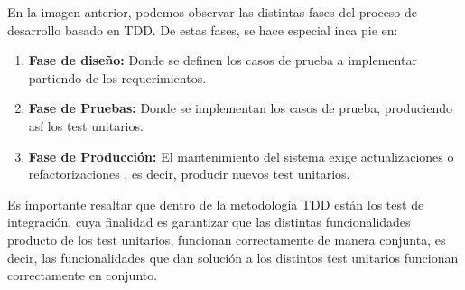 \documentclass[a4paper,11pt]{book}
\begin{document}
En la imagen anterior, podemos observar las distintas fases del proceso de desarrollo basado en TDD. De estas fases, se hace especial inca pie en:

\begin{enumerate}
\item \textbf{Fase de diseño:} Donde se definen los casos de prueba a implementar partiendo de los requerimientos.

\item \textbf{Fase de Pruebas:} Donde se implementan los casos de prueba, produciendo así los test unitarios.

\item \textbf{Fase de Producción:} El mantenimiento del sistema exige actualizaciones o refactorizaciones , es decir, producir nuevos test unitarios. 
\end{enumerate}

	 

Es importante resaltar que dentro de la metodología TDD están los test de integración, cuya finalidad es garantizar que las distintas funcionalidades producto de los test unitarios, funcionan correctamente de manera conjunta, es decir, las funcionalidades que dan solución a los  distintos test unitarios funcionan correctamente en conjunto. 
\end{document}
